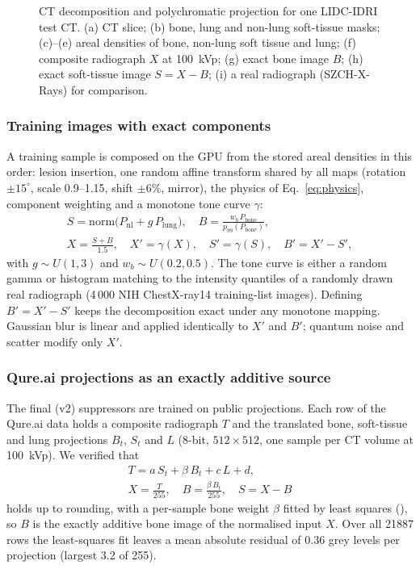 \begin{figure}[!t]
\centering
{}
\caption{CT decomposition and polychromatic projection for one LIDC-IDRI test CT. (a) CT slice; (b) bone, lung and non-lung soft-tissue
masks; (c)--(e) areal densities of bone, non-lung soft tissue and lung; (f) composite radiograph $X$ at 100~kVp; (g) exact bone image $B$;
(h) exact soft-tissue image $S=X-B$; (i) a real radiograph (SZCH-X-Rays) for comparison.}
\label{fig:pipeline}
\end{figure}

\subsubsection{Training images with exact components}
\label{sec:m-compose}
A training sample is composed on the GPU from the stored areal densities in this order: lesion insertion, one random affine transform
shared by all maps (rotation $\pm15^\circ$, scale 0.9--1.15, shift $\pm6\%$, mirror), the physics of Eq.~\eqref{eq:physics}, component
weighting and a monotone tone curve $\gamma$:
\begin{equation}
\begin{gathered}
S=\mathrm{norm}\big(P_{\mathrm{nl}}+g\,P_{\mathrm{lung}}\big),\quad B=\frac{w_b\,P_{\mathrm{bone}}}{p_{99}(P_{\mathrm{bone}})},\\
X=\frac{S+B}{1.5},\quad X'=\gamma(X),\quad S'=\gamma(S),\quad B'=X'-S',
\end{gathered}
\label{eq:compose}
\end{equation}
with $g\sim U(1,3)$ and $w_b\sim U(0.2,0.5)$. The tone curve is either a random gamma or histogram matching to the intensity quantiles of
a randomly drawn real radiograph (4\,000 NIH ChestX-ray14 training-list images). Defining $B'=X'-S'$ keeps the decomposition exact under
any monotone mapping. Gaussian blur is linear and applied identically to $X'$ and $B'$; quantum noise and scatter modify only $X'$.

\subsubsection{Qure.ai projections as an exactly additive source}
\label{sec:m-qure}
The final (v2) suppressors are trained on public projections. Each row of the Qure.ai data holds a composite radiograph $T$ and the
translated bone, soft-tissue and lung projections $B_t$, $S_t$ and $L$ (8-bit, $512\times512$, one sample per CT volume at 100~kVp). We
verified that
\begin{equation}
\begin{gathered}
T=a\,S_t+\beta\,B_t+c\,L+d,\\
X=\frac{T}{255},\quad B=\frac{\beta\,B_t}{255},\quad S=X-B
\end{gathered}
\label{eq:qure}
\end{equation}
holds up to rounding, with a per-sample bone weight $\beta$ fitted by least squares (), so $B$ is the exactly
additive bone image of the normalised input $X$. Over all \num{21887} rows the least-squares fit leaves a mean absolute residual of 0.36
grey levels per projection (largest 3.2 of 255).

